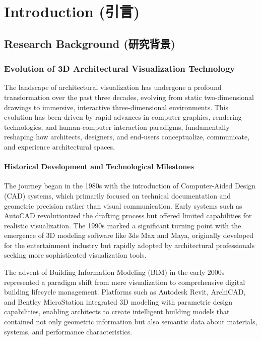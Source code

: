 \documentclass[12pt,a4paper]{book}
\begin{document}
\chapter{Introduction (引言)}
\label{ch:introduction}


\section{Research Background (研究背景)}
\label{sec:research_background}

\subsection{Evolution of 3D Architectural Visualization Technology}
\label{subsec:evolution_3d_visualization}

The landscape of architectural visualization has undergone a profound transformation over the past three decades, evolving from static two-dimensional drawings to immersive, interactive three-dimensional environments. This evolution has been driven by rapid advances in computer graphics, rendering technologies, and human-computer interaction paradigms, fundamentally reshaping how architects, designers, and end-users conceptualize, communicate, and experience architectural spaces.

\subsubsection{Historical Development and Technological Milestones}
\label{subsubsec:historical_development}

The journey began in the 1980s with the introduction of Computer-Aided Design (CAD) systems, which primarily focused on technical documentation and geometric precision rather than visual communication. Early systems such as AutoCAD revolutionized the drafting process but offered limited capabilities for realistic visualization. The 1990s marked a significant turning point with the emergence of 3D modeling software like 3ds Max and Maya, originally developed for the entertainment industry but rapidly adopted by architectural professionals seeking more sophisticated visualization tools.

The advent of Building Information Modeling (BIM) in the early 2000s represented a paradigm shift from mere visualization to comprehensive digital building lifecycle management. Platforms such as Autodesk Revit, ArchiCAD, and Bentley MicroStation integrated 3D modeling with parametric design capabilities, enabling architects to create intelligent building models that contained not only geometric information but also semantic data about materials, systems, and performance characteristics.
\end{document}
